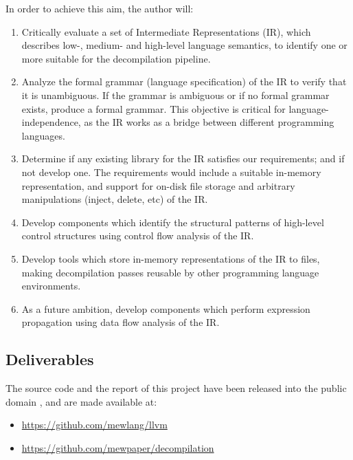 \documentclass[12pt, a4paper]{article}
\begin{document}
In order to achieve this aim, the author will:

\begin{enumerate}
	\item Critically evaluate a set of Intermediate Representations (IR), which
describes low-, medium- and high-level language semantics, to identify one or
more suitable for the decompilation pipeline.
	\item Analyze the formal grammar (language specification) of the IR to verify
that it is unambiguous. If the grammar is ambiguous or if no formal grammar
exists, produce a formal grammar. This objective is critical for
language-independence, as the IR works as a bridge between different programming
languages.
	\item Determine if any existing library for the IR satisfies our
requirements; and if not develop one. The requirements would include a suitable
in-memory representation, and support for on-disk file storage and arbitrary
manipulations (inject, delete, etc) of the IR.
	\item Develop components which identify the structural patterns of high-level
control structures using control flow analysis of the IR.
	\item Develop tools which store in-memory representations of the IR to files,
making decompilation passes reusable by other programming language environments.
	\item As a future ambition, develop components which perform expression
propagation using data flow analysis of the IR.
\end{enumerate}


\subsection{Deliverables}

The source code and the report of this project have been released into the
public domain \cite{cc0}, and are made available at:
\begin{itemize}
	\item \url{https://github.com/mewlang/llvm}
	\item \url{https://github.com/mewpaper/decompilation}
\end{itemize}

\end{document}
